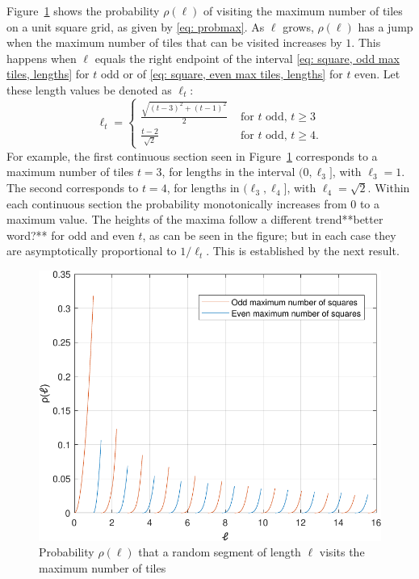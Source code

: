 \documentclass[12pt, a4paper]{article}
\newcommand{\probmax}{\rho} %
\newcommand{\len}{\ell} %
\newcommand{\tiles}{t} %
\begin{document}
Figure~\ref{fig: probmax_len} shows the probability $\probmax(\len)$ of visiting the maximum number of tiles on a unit square grid, as given by \eqref{eq: probmax}. As $\len$ grows, $\probmax(\len)$ has a jump when the maximum number of tiles that can be visited increases by $1$. This happens when $\len$ equals the right endpoint of the interval \eqref{eq: square, odd max tiles, lengths} for $\tiles$ odd or of \eqref{eq: square, even max tiles, lengths} for $\tiles$ even. Let these length values be denoted as $\len_\tiles$:
\begin{equation}
\len_\tiles = \begin{cases}
\displaystyle
\frac{\sqrt{(\tiles-3)^2 + (\tiles-1)^2}} {2} & \text{ for $\tiles$ odd, $\tiles \geq 3$} \\
\displaystyle
\frac{\tiles-2}{\sqrt{2}} & \text{ for $\tiles$ odd, $\tiles \geq 4$}.
\end{cases}
\end{equation}
For example, the first continuous section seen in Figure~\ref{fig: probmax_len} corresponds to a maximum number of tiles $\tiles=3$, for lengths in the interval $(0, \len_3]$, with $\len_3= 1$. The second corresponds to $\tiles=4$, for lengths in $(\len_3, \len_4]$, with $\len_4= \sqrt{2}$. Within each continuous section the probability monotonically increases from $0$ to a maximum value. The heights of the maxima follow a different trend**better word?** for odd and even $\tiles$, as can be seen in the figure; but in each case they are asymptotically proportional to $1/\len_\tiles$. This is established by the next result.

\begin{figure}%
\centering%
\includegraphics[width=.75\textwidth]{probmax_len}%
\caption{Probability $\probmax(\len)$ that a random segment of length $\len$ visits the maximum number of tiles%
}%
\label{fig: probmax_len}%
\end{figure}%
\end{document}
